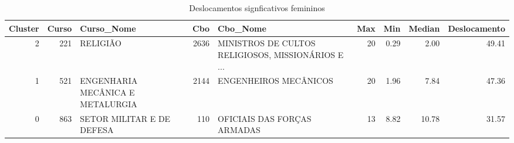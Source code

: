 \begin{table}
\centering
\caption{Deslocamentos signficativos femininos}
\label{tab:Salarios_Desequlibrio_F}
\begin{tabular}{rrlrlrrrr}
\toprule
 Cluster &  Curso &                       Curso\_Nome &  Cbo &                                           Cbo\_Nome &  Max &  Min &  Median &  Deslocamento \\
\midrule
       2 &    221 &                         RELIGIÃO & 2636 & MINISTROS DE CULTOS RELIGIOSOS, MISSIONÁRIOS E ... &   20 & 0.29 &    2.00 &         49.41 \\
       1 &    521 & ENGENHARIA MECÂNICA E METALURGIA & 2144 &                              ENGENHEIROS MECÂNICOS &   20 & 1.96 &    7.84 &         47.36 \\
       0 &    863 &        SETOR MILITAR E DE DEFESA &  110 &                        OFICIAIS DAS FORÇAS ARMADAS &   13 & 8.82 &   10.78 &         31.57 \\
\bottomrule
\end{tabular}
\end{table}
